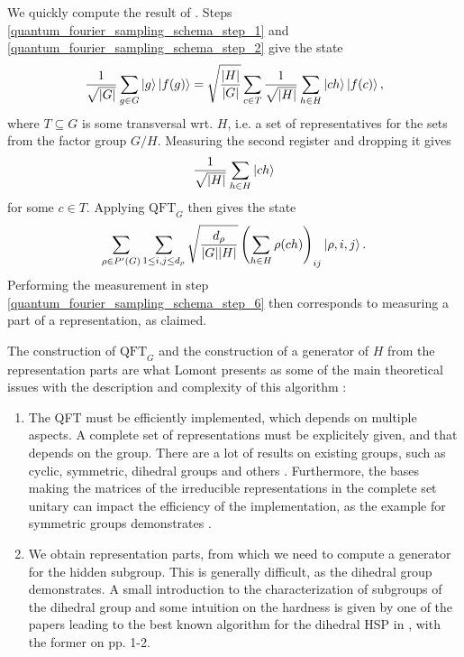\documentclass[10pt]{amsart}
\theoremstyle{definition}
\theoremstyle{remark}
\begin{document}
    We quickly compute the result of . Steps \ref{quantum_fourier_sampling_schema_step_1} and \ref{quantum_fourier_sampling_schema_step_2} give the state
    \begin{align}
        \frac{1}{\sqrt{|G|}} \sum_{g \in G} \ket{g}\ket{f(g)} = \sqrt{\frac{|H|}{|G|}} \sum_{c \in T} \frac{1}{\sqrt{|H|}} \sum_{h \in H} \ket{ch}\ket{f(c)},
    \end{align}
    where \(T \subseteq G\) is some transversal wrt. \(H\), i.e. a set of representatives for the sets from the factor group \(G/H\). Measuring the second register and dropping it gives
    \begin{align}
        \frac{1}{\sqrt{|H|}} \sum_{h \in H} \ket{ch}
    \end{align}
    for some \(c \in T\). Applying \(\text{QFT}_G\) then gives the state
    \begin{align}
        \sum_{\rho \in P'(G)}\sum_{1 \leq i, j \leq d_\rho} \sqrt{\frac{d_\rho}{|G||H|}} \left(\sum_{h \in H} \rho(ch)\right)_{ij} \ket{\rho, i, j}.
    \end{align}
    Performing the measurement in step \ref{quantum_fourier_sampling_schema_step_6} then corresponds to measuring a part of a representation, as claimed.

    \phantom{}

    The construction of \(\text{QFT}_G\) and the construction of a generator of \(H\) from the representation parts are what Lomont presents as some of the main theoretical issues with the description and complexity of this algorithm \cite[pp. 29-30]{Lomont2004}:
    \begin{enumerate}[wide]
        \item The QFT must be efficiently implemented, which depends on multiple aspects. A complete set of representations must be explicitely given, and that depends on the group. There are a lot of results on existing groups, such as cyclic, symmetric, dihedral groups and others \cite[p. 29]{Lomont2004} \cite[pp. 3-4]{Chen2022}. Furthermore, the bases making the matrices of the irreducible representations in the complete set unitary can impact the efficiency of the implementation, as the example for symmetric groups demonstrates \cite[pp. 29-30]{Lomont2004}.
        \item We obtain representation parts, from which we need to compute a generator for the hidden subgroup. This is generally difficult, as the dihedral group demonstrates. A small introduction to the characterization of subgroups of the dihedral group and some intuition on the hardness is given by one of the papers leading to the best known algorithm for the dihedral HSP in \cite{Kuperberg2004}, with the former on pp. 1-2.
    \end{enumerate}
\end{document}
